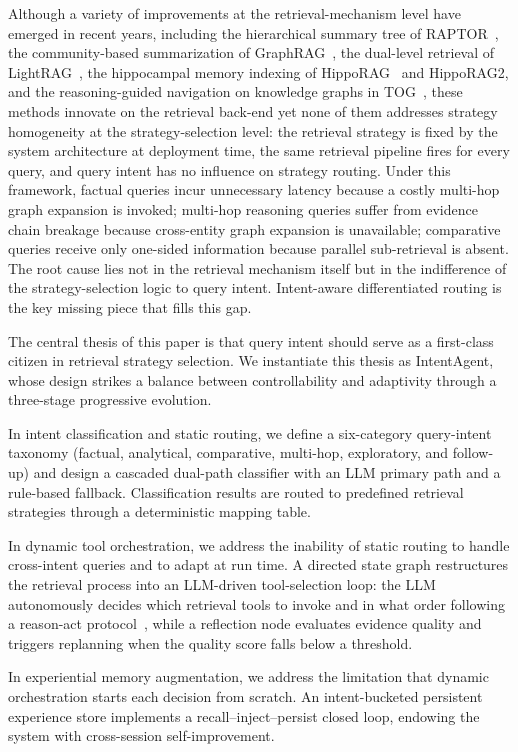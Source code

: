 \documentclass[runningheads]{llncs}
\begin{document}
Although a variety of improvements at the retrieval-mechanism level have emerged in recent years, including the hierarchical summary tree of RAPTOR~\cite{ref23}, the community-based summarization of GraphRAG~\cite{ref27}, the dual-level retrieval of LightRAG~\cite{ref26}, the hippocampal memory indexing of HippoRAG~\cite{ref28} and HippoRAG2, and the reasoning-guided navigation on knowledge graphs in TOG~\cite{ref24}, these methods innovate on the retrieval back-end yet none of them addresses strategy homogeneity at the strategy-selection level: the retrieval strategy is fixed by the system architecture at deployment time, the same retrieval pipeline fires for every query, and query intent has no influence on strategy routing. Under this framework, factual queries incur unnecessary latency because a costly multi-hop graph expansion is invoked; multi-hop reasoning queries suffer from evidence chain breakage because cross-entity graph expansion is unavailable; comparative queries receive only one-sided information because parallel sub-retrieval is absent. The root cause lies not in the retrieval mechanism itself but in the indifference of the strategy-selection logic to query intent. Intent-aware differentiated routing is the key missing piece that fills this gap.

The central thesis of this paper is that query intent should serve as a first-class citizen in retrieval strategy selection. We instantiate this thesis as IntentAgent, whose design strikes a balance between controllability and adaptivity through a three-stage progressive evolution.

In intent classification and static routing, we define a six-category query-intent taxonomy (factual, analytical, comparative, multi-hop, exploratory, and follow-up) and design a cascaded dual-path classifier with an LLM primary path and a rule-based fallback. Classification results are routed to predefined retrieval strategies through a deterministic mapping table.

In dynamic tool orchestration, we address the inability of static routing to handle cross-intent queries and to adapt at run time. A directed state graph restructures the retrieval process into an LLM-driven tool-selection loop: the LLM autonomously decides which retrieval tools to invoke and in what order following a reason-act protocol~\cite{ref13}, while a reflection node evaluates evidence quality and triggers replanning when the quality score falls below a threshold.

In experiential memory augmentation, we address the limitation that dynamic orchestration starts each decision from scratch. An intent-bucketed persistent experience store implements a recall--inject--persist closed loop, endowing the system with cross-session self-improvement.
\end{document}
